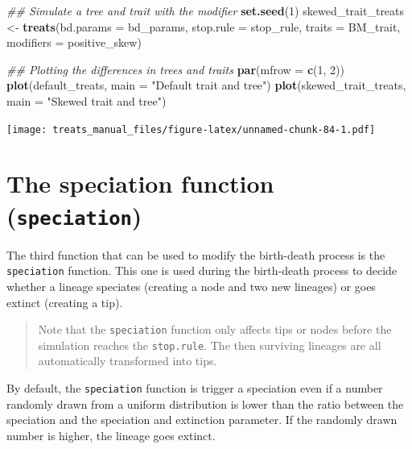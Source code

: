 \documentclass[
]{book}
\newenvironment{Shaded}{\begin{snugshade}}{\end{snugshade}}
\newcommand{\CommentTok}[1]{\textcolor[rgb]{0.56,0.35,0.01}{\textit{#1}}}
\newcommand{\DataTypeTok}[1]{\textcolor[rgb]{0.13,0.29,0.53}{#1}}
\newcommand{\DecValTok}[1]{\textcolor[rgb]{0.00,0.00,0.81}{#1}}
\newcommand{\KeywordTok}[1]{\textcolor[rgb]{0.13,0.29,0.53}{\textbf{#1}}}
\newcommand{\NormalTok}[1]{#1}
\newcommand{\StringTok}[1]{\textcolor[rgb]{0.31,0.60,0.02}{#1}}
\begin{document}
\begin{Shaded}
\begin{Highlighting}[]
\CommentTok{\#\# Simulate a tree and trait with the modifier}
\KeywordTok{set.seed}\NormalTok{(}\DecValTok{1}\NormalTok{)}
\NormalTok{skewed\_trait\_treats \textless{}{-}}\StringTok{ }\KeywordTok{treats}\NormalTok{(}\DataTypeTok{bd.params =}\NormalTok{ bd\_params,}
                              \DataTypeTok{stop.rule =}\NormalTok{ stop\_rule,}
                              \DataTypeTok{traits    =}\NormalTok{ BM\_trait,}
                              \DataTypeTok{modifiers =}\NormalTok{ positive\_skew)}

\CommentTok{\#\# Plotting the differences in trees and traits}
\KeywordTok{par}\NormalTok{(}\DataTypeTok{mfrow =} \KeywordTok{c}\NormalTok{(}\DecValTok{1}\NormalTok{, }\DecValTok{2}\NormalTok{))}
\KeywordTok{plot}\NormalTok{(default\_treats, }\DataTypeTok{main =} \StringTok{"Default trait and tree"}\NormalTok{)}
\KeywordTok{plot}\NormalTok{(skewed\_trait\_treats, }\DataTypeTok{main =} \StringTok{"Skewed trait and tree"}\NormalTok{)}
\end{Highlighting}
\end{Shaded}

\texttt{[image: treats\_manual\_files/figure-latex/unnamed-chunk-84-1.pdf]}

\hypertarget{the-speciation-function-speciation}{%
\section{\texorpdfstring{The speciation function (\texttt{speciation})}{The speciation function (speciation)}}\label{the-speciation-function-speciation}}

The third function that can be used to modify the birth-death process is the \texttt{speciation} function.
This one is used during the birth-death process to decide whether a lineage speciates (creating a node and two new lineages) or goes extinct (creating a tip).

\begin{quote}
Note that the \texttt{speciation} function only affects tips or nodes before the simulation reaches the \texttt{stop.rule}.
The then surviving lineages are all automatically transformed into tips.
\end{quote}

By default, the \texttt{speciation} function is trigger a speciation even if a number randomly drawn from a uniform distribution is lower than the ratio between the speciation and the speciation and extinction parameter. If the randomly drawn number is higher, the lineage goes extinct.
\end{document}
